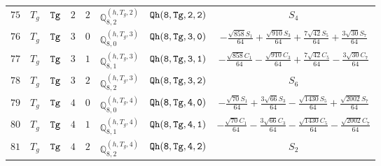 \documentclass[fleqn,8pt]{jsarticle}
\begin{document}
\begin{table}[ht!]
\begin{center}
\begin{tabular}{cccccccc}
$ 75 $ & $ T_{g} $ & $ {\tt Tg} $ & $ 2 $ & $ 2 $ & $ \mathbb{Q}_{8,2}^{(h,T_{g},2)} $ & $ {\tt Qh(8,Tg,2,2)} $ & $ S_{4} $ \\
$ 76 $ & $ T_{g} $ & $ {\tt Tg} $ & $ 3 $ & $ 0 $ & $ \mathbb{Q}_{8,0}^{(h,T_{g},3)} $ & $ {\tt Qh(8,Tg,3,0)} $ & $ - \frac{\sqrt{858} S_{1}}{64} + \frac{\sqrt{910} S_{3}}{64} + \frac{7 \sqrt{42} S_{5}}{64} + \frac{3 \sqrt{30} S_{7}}{64} $ \\
$ 77 $ & $ T_{g} $ & $ {\tt Tg} $ & $ 3 $ & $ 1 $ & $ \mathbb{Q}_{8,1}^{(h,T_{g},3)} $ & $ {\tt Qh(8,Tg,3,1)} $ & $ - \frac{\sqrt{858} C_{1}}{64} - \frac{\sqrt{910} C_{3}}{64} + \frac{7 \sqrt{42} C_{5}}{64} - \frac{3 \sqrt{30} C_{7}}{64} $ \\
$ 78 $ & $ T_{g} $ & $ {\tt Tg} $ & $ 3 $ & $ 2 $ & $ \mathbb{Q}_{8,2}^{(h,T_{g},3)} $ & $ {\tt Qh(8,Tg,3,2)} $ & $ S_{6} $ \\
$ 79 $ & $ T_{g} $ & $ {\tt Tg} $ & $ 4 $ & $ 0 $ & $ \mathbb{Q}_{8,0}^{(h,T_{g},4)} $ & $ {\tt Qh(8,Tg,4,0)} $ & $ - \frac{\sqrt{70} S_{1}}{64} + \frac{3 \sqrt{66} S_{3}}{64} - \frac{\sqrt{1430} S_{5}}{64} + \frac{\sqrt{2002} S_{7}}{64} $ \\
$ 80 $ & $ T_{g} $ & $ {\tt Tg} $ & $ 4 $ & $ 1 $ & $ \mathbb{Q}_{8,1}^{(h,T_{g},4)} $ & $ {\tt Qh(8,Tg,4,1)} $ & $ - \frac{\sqrt{70} C_{1}}{64} - \frac{3 \sqrt{66} C_{3}}{64} - \frac{\sqrt{1430} C_{5}}{64} - \frac{\sqrt{2002} C_{7}}{64} $ \\
$ 81 $ & $ T_{g} $ & $ {\tt Tg} $ & $ 4 $ & $ 2 $ & $ \mathbb{Q}_{8,2}^{(h,T_{g},4)} $ & $ {\tt Qh(8,Tg,4,2)} $ & $ S_{2} $ \\
 \hline \hline
\end{tabular}
\end{center}
\end{table}
\end{document}
